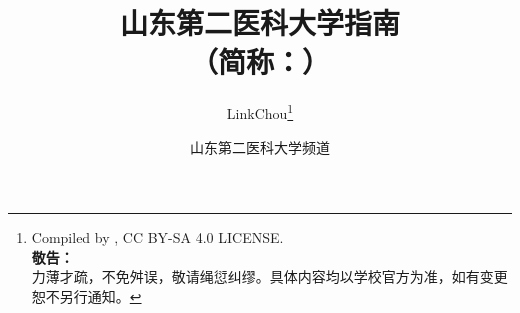 

\title{%
\normalsize
\vspace{100pt}
{\Huge\textbf{山东第二医科大学指南}}\\[10pt]
（简称：）\\[30pt]
{\large{}}\vspace*{-25pt}}
\author{LinkChou\thanks{Compiled by \LaTeXe, CC BY-SA 4.0 LICENSE.\qquad%
        \\
        \textbf{敬告：}\\
        \indent\indent 力薄才疏，不免舛误，敬请绳愆纠缪。具体内容均以学校官方为准，如有变更恕不另行通知。}
    \and 山东第二医科大学频道}
\date{}
\maketitle

\renewcommand{\thefootnote}{\arabic{footnote}}

\tableofcontents